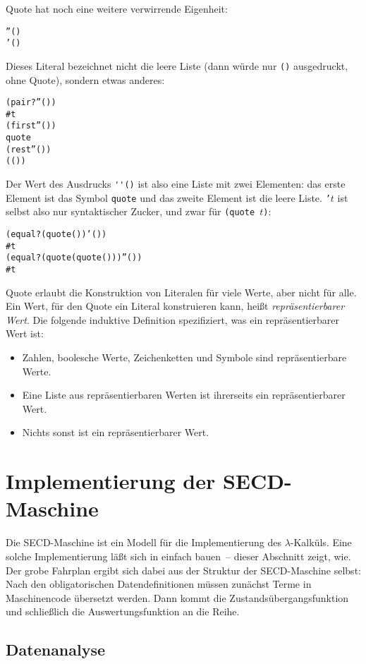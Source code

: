 Quote hat noch eine weitere verwirrende Eigenheit:
%
\begin{alltt}
''()
\evalsto{} '()
\end{alltt}
%
Dieses Literal bezeichnet nicht die leere Liste (dann würde nur
\texttt{()} ausgedruckt, ohne Quote), sondern etwas anderes:
%
\begin{alltt}
(pair? ''())
\evalsto{} #t
(first ''())
\evalsto{} quote
(rest ''())
\evalsto{} (())
\end{alltt}
%
Der Wert des Ausdrucks \verb|''()| ist also eine Liste mit zwei
Elementen: das erste Element ist das Symbol \texttt{quote} und das
zweite Element ist die leere Liste.  \texttt{'$t$}
ist selbst also nur syntaktischer Zucker, und zwar für \texttt{(quote
  $t$)}:
%
\begin{alltt}
(equal? (quote ()) '())
\evalsto{} #t
(equal? (quote (quote ())) ''())
\evalsto{} #t
\end{alltt}
%
Quote erlaubt die Konstruktion von Literalen für viele Werte, aber
nicht für alle.  Ein Wert, für den Quote ein Literal konstruieren kann,
heißt \textit{repräsentierbarer
  Wert}.  Die folgende induktive
Definition spezifiziert, was ein repräsentierbarer Wert ist:
%
\begin{itemize}
\item Zahlen, boolesche Werte, Zeichenketten und Symbole sind
  repräsentierbare Werte.
\item Eine Liste aus repräsentierbaren Werten ist ihrerseits ein
  repräsentierbarer Wert. 
\item Nichts sonst ist ein repräsentierbarer Wert.
\end{itemize}

\section{Implementierung der SECD-Maschine}

Die SECD-Maschine ist ein Modell für die Implementierung des
$\lambda$-Kalküls.  Eine solche Implementierung läßt sich in
einfach bauen~-- dieser Abschnitt zeigt, wie.  Der grobe
Fahrplan ergibt sich dabei aus der Struktur der SECD-Maschine selbst:
Nach den obligatorischen Datendefinitionen müssen zunächst Terme in
Maschinencode übersetzt werden.  Dann kommt die
Zustandsübergangsfunktion und schließlich die Auswertungsfunktion an
die Reihe.

\subsection{Datenanalyse}
\label{sec:secd-datenanalyse}

